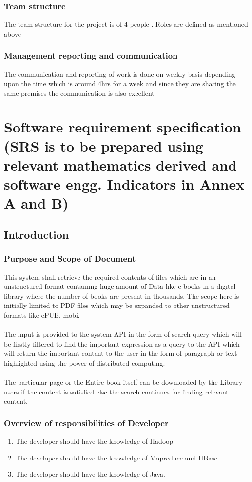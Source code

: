 \documentclass[oneside,a4paper,12pt]{report}
\begin{document}
\subsection{Team structure}
The team structure for the project is of 4 people . Roles are defined as mentioned above

\subsection{Management reporting and communication}
The communication and reporting of work is done on weekly basis depending upon the time which is around 4hrs for a week and since they are sharing the same premises the communication is also excellent
 
\chapter{Software requirement specification  (SRS is to be prepared using relevant mathematics derived and software engg. Indicators in Annex A and B)}

\section{Introduction}
\subsection{Purpose and Scope of Document}
This system shall retrieve the required contents of files which are in an unstructured format containing huge amount of Data like e-books in a digital library where the number of books are present in thousands. The scope here is initially limited to PDF files which may be expanded to other unstructured formats like ePUB, mobi. \\ \\
The input is provided to the system API in the form of search query which will be firstly filtered to find the important expression as a query to the API which will return the important content to the user in the form of paragraph or text highlighted using the power of distributed computing. \\ \\
The particular page or the Entire book itself can be downloaded by the Library users if the content is satisfied else the search continues for finding relevant content.

\subsection{Overview of responsibilities of Developer}
\begin{enumerate}
\item The developer should have the knowledge of Hadoop.
\item The developer should have the knowledge of Mapreduce and HBase.
\item The developer should have the knowledge of Java.
\end{enumerate}
\end{document}
